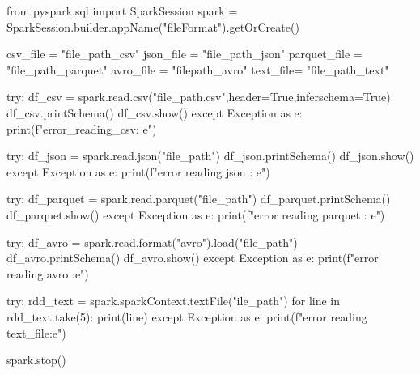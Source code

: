 
from pyspark.sql import SparkSession
spark = SparkSession.builder.appName("fileFormat").getOrCreate()

csv_file = "file_path_csv"
json_file = "file_path_json"
parquet_file = "file_path_parquet"
avro_file = "filepath_avro"
text_file= "file_path_text"

try:
    df_csv = spark.read.csv("file_path.csv",header=True,inferschema=True)
    df_csv.printSchema()
    df_csv.show()
except Exception as e:
    print(f"error_reading_csv: {e}")
    
try:
    df_json = spark.read.json("file_path")
    df_json.printSchema()
    df_json.show()
except Exception as e:
    print(f"error reading json : {e}")
    
try:
    df_parquet = spark.read.parquet("file_path")
    df_parquet.printSchema()
    df_parquet.show()
except Exception as e:
    print(f"error reading parquet : {e}")
    
try:
    df_avro = spark.read.format("avro").load("file_path")
    df_avro.printSchema()
    df_avro.show()
except Exception as e:
    print(f"error reading avro :{e}")
    
try:
    rdd_text = spark.sparkContext.textFile("ile_path")
    for line in rdd_text.take(5):
        print(line)
except Exception as e:
    print(f"error reading text_file:{e}")

spark.stop()


    
    




